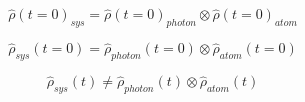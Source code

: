 \documentclass{article}
\newcommand{\dens}{\hat{\rho}}
\begin{document}
\begin{equation*}
\dens(t=0)_{sys} = \dens(t=0)_{photon} \otimes \dens(t=0)_{atom} 
\end{equation*}

\begin{equation*}
\dens_{sys}(t=0) = \dens_{photon}(t=0) \otimes \dens_{atom}(t=0) 
\end{equation*}

\begin{equation*}
\dens_{sys}(t) \neq \dens_{photon}(t) \otimes \dens_{atom}(t) 
\end{equation*}
\end{document}
